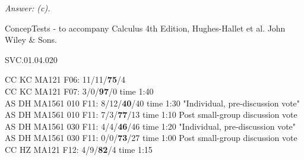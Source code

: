 {\it Answer: (c).} 

\medskip

\medskip
ConcepTests - to accompany Calculus 4th Edition, Hughes-Hallet et al. John Wiley \& Sons.

SVC.01.04.020


CC KC MA121 F06: 11/11/{\bf 75}/4 \\
CC KC MA121 F07: 3/0/{\bf97}/0 time 1:40 \\
AS DH MA1561 010 F11: 8/12/{\bf40}/40 time 1:30 "Individual, pre-discussion vote" \\
AS DH MA1561 010 F11: 7/3/{\bf77}/13 time 1:10 Post small-group discussion vote \\
AS DH MA1561 030 F11: 4/4/{\bf46}/46 time 1:20 "Individual, pre-discussion vote" \\
AS DH MA1561 030 F11: 0/0/{\bf73}/27 time 1:00 Post small-group discussion vote \\
CC HZ MA121 F12: 4/9/{\bf82}/4 time 1:15  \\
